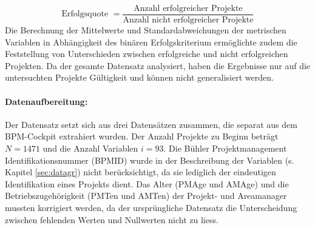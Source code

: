 \begin{equation*}
\text{Erfolgsquote } = \frac{\text{Anzahl erfolgreicher Projekte}}{\text{Anzahl nicht erfolgreicher Projekte}} 
\end{equation*}
Die Berechnung der Mittelwerte und Standardabweichungen der metrischen Variablen in Abhängigkeit des binären Erfolgskriterium ermöglichte zudem die Feststellung von Unterschieden zwischen erfolgreiche und nicht erfolgreichen Projekten.
Da der gesamte Datensatz analysiert, haben die Ergebnisse nur auf die untersuchten Projekte Gültigkeit und können nicht generalisiert werden.
\newline\newline
\paragraph{Datenaufbereitung: } Der Datensatz setzt sich aus drei Datensätzen zusammen, die separat aus dem BPM-Cockpit extrahiert wurden. Der Anzahl Projekte zu Beginn beträgt $N = 1471$ und die Anzahl Variablen $i = 93$. Die Bühler Projektmanagement Identifikationsnummer (BPMID) wurde in der Beschreibung der Variablen (s. Kapitel \ref{sec:datagr}) nicht berücksichtigt, da sie lediglich der eindeutigen Identifikation eines Projekts dient. Das Alter (PMAge und AMAge) und die Betriebszugehörigkeit (PMTen und AMTen) der Projekt- und Areamanager mussten korrigiert werden, da der ursprüngliche Datensatz die Unterscheidung zwischen fehlenden Werten und Nullwerten nicht zu liess.
\newline\newline
